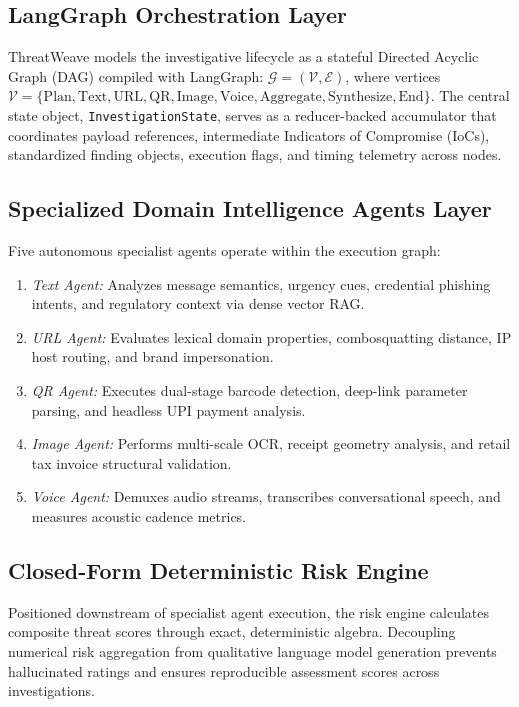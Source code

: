 \documentclass[conference]{IEEEtran}
\begin{document}
\subsection{LangGraph Orchestration Layer}
ThreatWeave models the investigative lifecycle as a stateful Directed Acyclic Graph (DAG) compiled with LangGraph: $\mathcal{G} = (\mathcal{V}, \mathcal{E})$, where vertices $\mathcal{V} = \{\text{Plan}, \text{Text}, \text{URL}, \text{QR}, \text{Image}, \text{Voice}, \text{Aggregate}, \text{Synthesize}, \text{End}\}$. The central state object, \texttt{InvestigationState}, serves as a reducer-backed accumulator that coordinates payload references, intermediate Indicators of Compromise (IoCs), standardized finding objects, execution flags, and timing telemetry across nodes.

\subsection{Specialized Domain Intelligence Agents Layer}
Five autonomous specialist agents operate within the execution graph:
\begin{enumerate}
    \item \textit{Text Agent:} Analyzes message semantics, urgency cues, credential phishing intents, and regulatory context via dense vector RAG.
    \item \textit{URL Agent:} Evaluates lexical domain properties, combosquatting distance, IP host routing, and brand impersonation.
    \item \textit{QR Agent:} Executes dual-stage barcode detection, deep-link parameter parsing, and headless UPI payment analysis.
    \item \textit{Image Agent:} Performs multi-scale OCR, receipt geometry analysis, and retail tax invoice structural validation.
    \item \textit{Voice Agent:} Demuxes audio streams, transcribes conversational speech, and measures acoustic cadence metrics.
\end{enumerate}

\subsection{Closed-Form Deterministic Risk Engine}
Positioned downstream of specialist agent execution, the risk engine calculates composite threat scores through exact, deterministic algebra. Decoupling numerical risk aggregation from qualitative language model generation prevents hallucinated ratings and ensures reproducible assessment scores across investigations.
\end{document}
